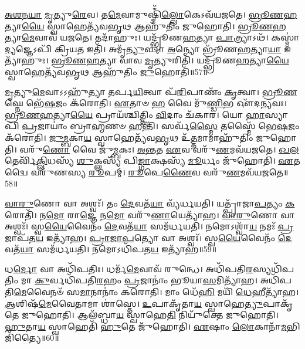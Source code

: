 \-\ul{𑌅}\-\-\ul{𑌶}\-\-\ul{𑌨}\-\-\ul{𑌯𑌾} \ul{𑌮𑍃}\-𑌤𑍍𑌯𑍁\-\ul{𑌰𑍇}\-𑌵।
𑌤\-\ul{𑌮𑍇}\-𑌵𑌾𑌮𑍁𑌷𑍍𑌮𑌿𑌁᳴\-\ul{𑌲𑍍𑌲𑍋}\-𑌕𑍇\-𑌽𑌵᳴𑌯𑌜𑌤𑍇।
\-\ul{𑌭𑍍𑌰𑍂}\-\-\ul{𑌣}\-\-\ul{𑌹}\-𑌤𑍍𑌯𑌾\-\ul{𑌯𑍈} 𑌸𑍍𑌵𑌾𑌹𑍇𑌤𑍍𑌯᳴𑌵\-\ul{𑌭𑍃}\-𑌥 𑌆𑌹𑍁᳴𑌤𑌿𑌂 𑌜𑍁𑌹𑍋𑌤𑌿।
\-\ul{𑌭𑍍𑌰𑍂}\-\-\ul{𑌣}\-\-\ul{𑌹}\-𑌤𑍍𑌯𑌾\-\ul{𑌮𑍇}\-𑌵𑌾𑌵᳴ 𑌯𑌜𑌤𑍇।
𑌤𑌦𑌾᳴𑌹𑍁𑌃।
𑌯𑌦𑍍𑌭𑍍𑌰𑍂᳴𑌣\-\ul{𑌹}\-𑌤𑍍𑌯𑌾 \ul{𑌪𑌾}\-𑌤𑍍𑌰𑍍𑌯𑌾𑌽𑌥᳴।
𑌕𑌸𑍍𑌮𑌾॑\-\ul{𑌦𑍍𑌯}\-𑌜𑍍𑌞𑍇𑌽𑌪𑌿᳴ 𑌕𑍍𑌰𑌿𑌯\-\ul{𑌤} 𑌇𑌤𑌿᳴।
𑌅𑌮𑍃᳴\-\ul{𑌤𑍍𑌯𑍁}\-𑌰𑍍𑌵𑌾 \ul{𑌅}\-𑌨𑍍𑌯𑍋 𑌭𑍍𑌰𑍂᳴𑌣\-\ul{𑌹}\-𑌤𑍍𑌯𑌾\-\ul{𑌯𑌾} 𑌇𑌤𑍍𑌯𑌾᳴𑌹𑍁𑌃।
\-\ul{𑌭𑍍𑌰𑍂}\-\-\ul{𑌣}\-\-\ul{𑌹}\-𑌤𑍍𑌯𑌾 𑌵𑌾𑌵 \ul{𑌮𑍃}\-𑌤𑍍𑌯𑍁𑌰𑌿𑌤𑌿᳴।
𑌯𑌦𑍍𑌭𑍍𑌰𑍂᳴𑌣\-\ul{𑌹}\-𑌤𑍍𑌯𑌾\-\ul{𑌯𑍈} 𑌸𑍍𑌵𑌾𑌹𑍇𑌤𑍍𑌯᳴𑌵\-\ul{𑌭𑍃}\-𑌥 𑌆𑌹𑍁᳴𑌤𑌿𑌂 \ul{𑌜𑍁}\-𑌹𑍋𑌤𑌿᳴॥57॥

\-\ul{𑌮𑍃}\-𑌤𑍍𑌯𑍁\-\ul{𑌮𑍇}\-𑌵𑌾𑌽𑌽𑌹𑍁᳴𑌤𑍍𑌯𑌾 𑌤𑌰𑍍𑌪\-\ul{𑌯𑌿}\-𑌤𑍍𑌵𑌾 𑌪᳴\-\ul{𑌰𑌿}\-𑌪𑌾𑌣𑌂᳴ \ul{𑌕𑍃}\-𑌤𑍍𑌵𑌾।
\-\ul{𑌭𑍍𑌰𑍂}\-\-\ul{𑌣}\-𑌘𑍍𑌨𑍇 𑌭𑍇᳴\-\ul{𑌷}\-𑌜𑌂 𑌕᳴𑌰𑍋𑌤𑌿।
\-\ul{𑌏}\-𑌤𑌾𑍞 \ul{𑌹} 𑌵𑍈 𑌮𑍁᳴\-\ul{𑌣𑍍𑌡𑌿}\-𑌭 𑌔᳴𑌦\-\ul{𑌨𑍍𑌯}\-𑌵𑌃।
\-\ul{𑌭𑍍𑌰𑍂}\-\-\ul{𑌣}\-\-\ul{𑌹}\-𑌤𑍍𑌯𑌾\-\ul{𑌯𑍈} 𑌪𑍍𑌰𑌾𑌯᳴𑌶𑍍𑌚𑌿𑌤𑍍𑌤𑌿𑌂 \ul{𑌵𑌿}\-𑌦𑌾𑌂 𑌚᳴𑌕𑌾𑌰।
𑌯𑍋 \ul{𑌹𑌾}\-𑌸𑍍𑌯𑌾𑌪𑌿᳴ \ul{𑌪𑍍𑌰}\-𑌜𑌾𑌯𑌾𑌂॑ 𑌬𑍍𑌰𑌾\-\ul{𑌹𑍍𑌮}\-𑌣𑍞 𑌹𑌨𑍍𑌤𑌿᳴।
𑌸𑌰𑍍𑌵᳴\-\ul{𑌸𑍍𑌮𑍈} 𑌤𑌸𑍍𑌮𑍈᳴ 𑌭𑍇\-\ul{𑌷}\-𑌜𑌂 𑌕᳴𑌰𑍋𑌤𑌿।
\-\ul{𑌜𑍁}\-\-\ul{𑌮𑍍𑌬}\-𑌕𑌾\-\ul{𑌯} 𑌸𑍍𑌵𑌾𑌹𑍇𑌤𑍍𑌯᳴𑌵\-\ul{𑌭𑍃}\-𑌥 𑌉᳴\-\ul{𑌤𑍍𑌤}\-𑌮𑌾𑌮𑌾𑌹𑍁᳴𑌤𑌿𑌂 𑌜𑍁𑌹𑍋𑌤𑌿।
𑌵𑌰𑍁᳴\-\ul{𑌣𑍋} 𑌵𑍈 𑌜𑍁᳴\-\ul{𑌮𑍍𑌬}\-𑌕𑌃।
\-\ul{𑌅}\-\-\ul{𑌨𑍍𑌤}\-𑌤 \ul{𑌏}\-𑌵 𑌵𑌰𑍁᳴\-\ul{𑌣}\-𑌮𑌵᳴𑌯𑌜𑌤𑍇।
\-\ul{𑌖}\-\-\ul{𑌲}\-𑌤𑍇𑌰𑍍𑌵𑌿᳴\-\ul{𑌕𑍍𑌲𑌿}\-𑌧𑌸𑍍𑌯᳴ \ul{𑌶𑍁}\-𑌕𑍍𑌲𑌸𑍍𑌯᳴ 𑌪𑌿\-\ul{𑌙𑍍𑌗𑌾}\-𑌕𑍍𑌷𑌸𑍍𑌯᳴ \ul{𑌮𑍂}\-𑌰𑍍𑌧𑌂 𑌜𑍁᳴𑌹𑍋𑌤𑌿।
\-\ul{𑌏}\-𑌤𑌦𑍍𑌵𑍈 𑌵𑌰𑍁᳴𑌣𑌸𑍍𑌯 \ul{𑌰𑍂}\-𑌪𑌮𑍍।
\-\ul{𑌰𑍂}\-𑌪𑍇\-\ul{𑌣𑍈}\-𑌵 𑌵𑌰𑍁᳴\-\ul{𑌣}\-𑌮𑌵᳴𑌯𑌜𑌤𑍇॥58॥\anuvakamend[\-\ul{𑌲𑍋}\-𑌕𑍇 \ul{𑌮𑍃}\-𑌤𑍍𑌯𑍁\-\ul{𑌰𑍍𑌜𑍁}\-𑌹𑍋𑌤𑌿᳴ \ul{𑌮𑍂}\-𑌰𑍍𑌧𑌂 𑌜𑍁᳴𑌹𑍋\-\ul{𑌤𑌿} 𑌦𑍍𑌵𑍇 𑌚᳴]

\-\ul{𑌵𑌾}\-\-\ul{𑌰𑍁}\-𑌣𑍋 𑌵𑌾 𑌅𑌶𑍍𑌵𑌃᳴।
𑌤𑌂 \ul{𑌦𑍇}\-𑌵𑌤᳴\-\ul{𑌯𑌾} 𑌵𑍍𑌯᳴𑌰𑍍𑌧𑌯𑌤𑌿।
𑌯𑌤𑍍𑌪𑍍𑌰𑌾᳴𑌜𑌾\-\ul{𑌪}\-𑌤𑍍𑌯𑌂 \ul{𑌕}\-𑌰𑍋𑌤𑌿᳴।
𑌨\-\ul{𑌮𑍋} 𑌰𑌾\-\ul{𑌜𑍍𑌞𑍇} 𑌨\-\ul{𑌮𑍋} 𑌵𑌰𑍁᳴\-\ul{𑌣𑌾}\-𑌯𑍇𑌤𑍍𑌯𑌾᳴𑌹।
\-\ul{𑌵𑌾}\-\-\ul{𑌰𑍁}\-𑌣𑍋 𑌵𑌾 𑌅𑌶𑍍𑌵𑌃᳴।
𑌸𑍍𑌵\-\ul{𑌯𑍈}\-𑌵𑍈𑌨𑌂᳴ \ul{𑌦𑍇}\-𑌵𑌤᳴\-\ul{𑌯𑌾} 𑌸𑌮᳴𑌰𑍍𑌧𑌯𑌤𑌿।
𑌨𑌮𑍋𑌽𑌶𑍍𑌵𑌾᳴\-\ul{𑌯} 𑌨𑌮𑌃᳴ \ul{𑌪𑍍𑌰}\-𑌜𑌾𑌪᳴𑌤\-\ul{𑌯} 𑌇𑌤𑍍𑌯𑌾᳴𑌹।
\-\ul{𑌪𑍍𑌰𑌾}\-\-\ul{𑌜𑌾}\-\-\ul{𑌪}\-𑌤𑍍𑌯𑍋 𑌵𑌾 𑌅𑌶𑍍𑌵𑌃᳴।
𑌸𑍍𑌵\-\ul{𑌯𑍈}\-𑌵𑍈𑌨𑌂᳴ \ul{𑌦𑍇}\-𑌵𑌤᳴\-\ul{𑌯𑌾} 𑌸𑌮᳴𑌰𑍍𑌧𑌯𑌤𑌿।
𑌨𑌮𑍋𑌽𑌧𑌿᳴𑌪𑌤\-\ul{𑌯} 𑌇𑌤𑍍𑌯𑌾᳴𑌹॥59॥

𑌧\-\ul{𑌰𑍍𑌮𑍋} 𑌵𑌾 𑌅𑌧𑌿᳴𑌪𑌤𑌿𑌃।
𑌧𑌰𑍍𑌮᳴\-\ul{𑌮𑍇}\-𑌵𑌾𑌵᳴ 𑌰𑍁𑌨𑍍𑌧𑍇।
𑌅𑌧𑌿᳴𑌪𑌤𑌿\-\ul{𑌰}\-𑌸𑍍𑌯𑌧𑌿᳴𑌪𑌤𑌿𑌂 𑌮𑌾 \ul{𑌕𑍁}\-𑌰𑍍𑌵𑌧𑌿᳴𑌪𑌤𑌿\-\ul{𑌰}\-𑌹𑌂 \ul{𑌪𑍍𑌰}\-𑌜𑌾𑌨𑌾𑌂॑ 𑌭𑍂𑌯𑌾\-\ul{𑌸}\-𑌮𑌿𑌤𑍍𑌯𑌾᳴𑌹।
𑌅𑌧𑌿᳴𑌪𑌤𑌿\-\ul{𑌮𑍇}\-𑌵𑍈𑌨𑍞᳴ 𑌸\-\ul{𑌮𑌾}\-𑌨𑌾𑌨𑌾𑌂॑ 𑌕𑌰𑍋𑌤𑌿।
𑌮𑌾𑌂 𑌧𑍇᳴\-\ul{𑌹𑌿} 𑌮𑌯𑌿᳴ \ul{𑌧𑍇}\-𑌹𑍀𑌤𑍍𑌯𑌾᳴𑌹।
\-\ul{𑌆}\-𑌶𑌿𑌷᳴\-\-\ul{𑌮𑍇}\-𑌵𑍈𑌤𑌾𑌮𑌾 𑌶𑌾॑𑌸𑍍𑌤𑍇।
\-\ul{𑌉}\-𑌪𑌾𑌕𑍃᳴𑌤𑌾\-\ul{𑌯} 𑌸𑍍𑌵𑌾𑌹𑍇\-\ul{𑌤𑍍𑌯𑍁}\-𑌪𑌾𑌕𑍃᳴𑌤𑍇 𑌜𑍁𑌹𑍋𑌤𑌿।
𑌆𑌲᳴𑌬𑍍𑌧𑌾\-\ul{𑌯} 𑌸𑍍𑌵𑌾𑌹𑍇\-\ul{𑌤𑌿} 𑌨𑌿𑌯𑍁᳴𑌕𑍍𑌤𑍇 𑌜𑍁𑌹𑍋𑌤𑌿।
\-\ul{𑌹𑍁}\-𑌤𑌾\-\ul{𑌯} 𑌸𑍍𑌵𑌾𑌹𑍇𑌤𑌿᳴ \ul{𑌹𑍁}\-𑌤𑍇 𑌜𑍁᳴𑌹𑍋𑌤𑌿।
\-\ul{𑌏}\-𑌷𑌾𑌂 \ul{𑌲𑍋}\-𑌕𑌾𑌨𑌾᳴\-\ul{𑌮}\-𑌭𑌿𑌜𑌿᳴𑌤𑍍𑌯𑍈॥60॥

